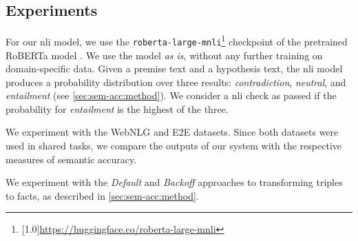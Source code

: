 \documentclass[12pt,notitlepage,a4paper,oneside,openany]{report}
\renewcommand\cite{\citep}
\begin{document}
\subsection{Experiments}
\label{sec:sem-acc:experiments}
For our \ac{nli} model, we use the \texttt{roberta-large-mnli}\footnote{\scalebox{0.95}[1.0]{\url{https://huggingface.co/roberta-large-mnli}}} checkpoint of the pretrained RoBERTa model \cite{liuRoBERTaRobustlyOptimized2019}. We use the model \textit{as is}, without any further training on domain-specific data.
Given a premise text and a hypothesis text, the \ac{nli} model produces a probability distribution over three results: \textit{contradiction}, \textit{neutral},
and \textit{entailment} (see \autoref{sec:sem-acc:method}). We consider a \ac{nli} check as passed if the probability for \textit{entailment} is the highest of the three.


We experiment with the WebNLG and E2E datasets. Since both datasets were used in shared tasks, we compare the outputs of our system with the respective measures of semantic accuracy.


We experiment with the \emph{Default} and \emph{Backoff} approaches to transforming triples to facts, as described in \autoref{sec:sem-acc:method}.

\end{document}
